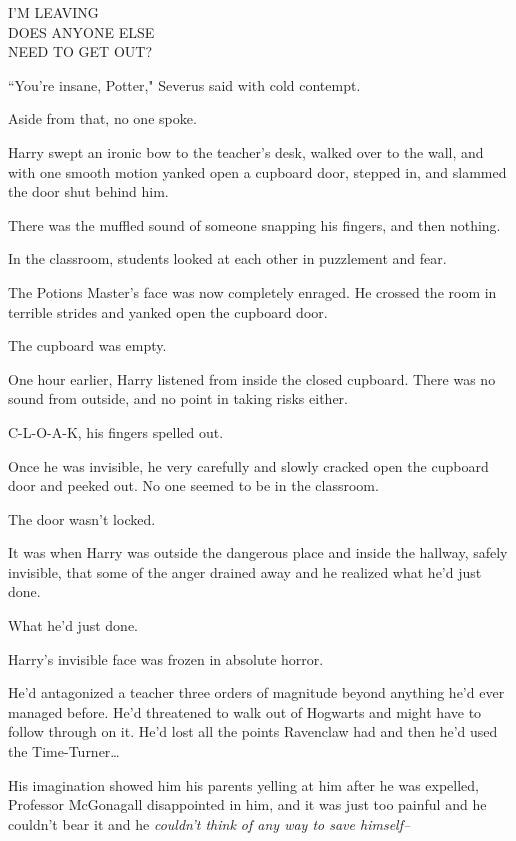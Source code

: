 \begin{writtenNote}
I'M LEAVING\\
DOES ANYONE ELSE\\
NEED TO GET OUT?
\end{writtenNote}

``You're insane, Potter," Severus said with cold contempt.

Aside from that, no one spoke.

Harry swept an ironic bow to the teacher's desk, walked over to the wall, and with one smooth motion yanked open a cupboard door, stepped in, and slammed the door shut behind him.

There was the muffled sound of someone snapping his fingers, and then nothing.

In the classroom, students looked at each other in puzzlement and fear.

The Potions Master's face was now completely enraged. He crossed the room in terrible strides and yanked open the cupboard door.

The cupboard was empty.

\later

One hour earlier, Harry listened from inside the closed cupboard. There was no sound from outside, and no point in taking risks either.

C-L-O-A-K, his fingers spelled out.

Once he was invisible, he very carefully and slowly cracked open the cupboard door and peeked out. No one seemed to be in the classroom.

The door wasn't locked.

It was when Harry was outside the dangerous place and inside the hallway, safely invisible, that some of the anger drained away and he realized what he'd just done.

What he'd just done.

Harry's invisible face was frozen in absolute horror.

He'd antagonized a teacher three orders of magnitude beyond anything he'd ever managed before. He'd threatened to walk out of Hogwarts and might have to follow through on it. He'd lost all the points Ravenclaw had and then he'd used the Time-Turner{\ldots}

His imagination showed him his parents yelling at him after he was expelled, Professor McGonagall disappointed in him, and it was just too painful and he couldn't bear it and he \emph{couldn't think of any way to save himself\---}

